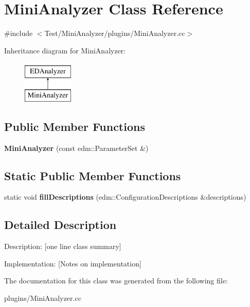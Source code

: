 \hypertarget{classMiniAnalyzer}{\section{Mini\-Analyzer Class Reference}
\label{classMiniAnalyzer}
}


{\ttfamily \#include $<$Test/\-Mini\-Analyzer/plugins/\-Mini\-Analyzer.\-cc$>$}

Inheritance diagram for Mini\-Analyzer\-:\begin{figure}[H]
\begin{center}
\leavevmode
\includegraphics[height=2.000000cm]{classMiniAnalyzer}
\end{center}
\end{figure}
\subsection*{Public Member Functions}
\begin{DoxyCompactItemize}
\item 
\hypertarget{classMiniAnalyzer_af72bdff149b72fdc02f44995b982a778}{{\bfseries Mini\-Analyzer} (const edm\-::\-Parameter\-Set \&)}\label{classMiniAnalyzer_af72bdff149b72fdc02f44995b982a778}

\end{DoxyCompactItemize}
\subsection*{Static Public Member Functions}
\begin{DoxyCompactItemize}
\item 
\hypertarget{classMiniAnalyzer_a5199abda9815be60babdc07c76fa2c90}{static void {\bfseries fill\-Descriptions} (edm\-::\-Configuration\-Descriptions \&descriptions)}\label{classMiniAnalyzer_a5199abda9815be60babdc07c76fa2c90}

\end{DoxyCompactItemize}


\subsection{Detailed Description}
Description\-: \mbox{[}one line class summary\mbox{]}

Implementation\-: \mbox{[}Notes on implementation\mbox{]} 

The documentation for this class was generated from the following file\-:\begin{DoxyCompactItemize}
\item 
plugins/Mini\-Analyzer.\-cc\end{DoxyCompactItemize}
